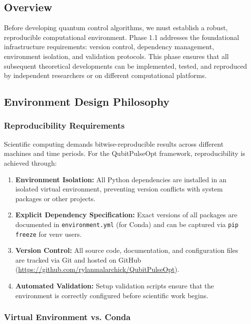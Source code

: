\documentclass[11pt,a4paper]{article}
\theoremstyle{definition}
\theoremstyle{remark}
\begin{document}
\subsection{Overview}

Before developing quantum control algorithms, we must establish a robust, reproducible computational environment. Phase 1.1 addresses the foundational infrastructure requirements: version control, dependency management, environment isolation, and validation protocols. This phase ensures that all subsequent theoretical developments can be implemented, tested, and reproduced by independent researchers or on different computational platforms.

\subsection{Environment Design Philosophy}

\subsubsection{Reproducibility Requirements}

Scientific computing demands bitwise-reproducible results across different machines and time periods. For the QubitPulseOpt framework, reproducibility is achieved through:

\begin{enumerate}[label=\arabic*.]
    \item \textbf{Environment Isolation:} All Python dependencies are installed in an isolated virtual environment, preventing version conflicts with system packages or other projects.
    \item \textbf{Explicit Dependency Specification:} Exact versions of all packages are documented in \texttt{environment.yml} (for Conda) and can be captured via \texttt{pip freeze} for venv users.
    \item \textbf{Version Control:} All source code, documentation, and configuration files are tracked via Git and hosted on GitHub (\url{https://github.com/rylanmalarchick/QubitPulseOpt}).
    \item \textbf{Automated Validation:} Setup validation scripts ensure that the environment is correctly configured before scientific work begins.
\end{enumerate}

\subsubsection{Virtual Environment vs. Conda}
\end{document}
